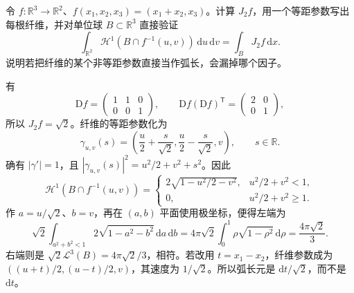 \begin{exercise}\label{g3:ex:coarea-oblique-projection}
	令 \(f:\mathbb R^3\to\mathbb R^2\)、\(f(x_1,x_2,x_3)=(x_1+x_2,x_3)\)。计算 \(J_2f\)，用一个等距参数写出每根纤维，并对单位球 \(B\subset\mathbb R^3\) 直接验证
	\[
		\int_{\mathbb R^2}\mathcal H^1(B\cap f^{-1}(u,v))\,\mathrm du\,\mathrm dv
		=\int_BJ_2f\,\mathrm dx.
	\]
	说明若把纤维的某个非等距参数直接当作弧长，会漏掉哪个因子。
\end{exercise}
\begin{solution}
	有
	\[
		\mathrm Df=\begin{pmatrix}1&1&0\\0&0&1\end{pmatrix},
		\qquad \mathrm Df(\mathrm Df)^{\mathsf T}=\begin{pmatrix}2&0\\0&1\end{pmatrix},
	\]
	所以 \(J_2f=\sqrt2\)。纤维的等距参数化为
	\[
		\gamma_{u,v}(s)=\left(\frac u2+\frac s{\sqrt2},
		\frac u2-\frac s{\sqrt2},v\right),\qquad s\in\mathbb R.
	\]
	确有 \(|\gamma'|=1\)，且 \(|\gamma_{u,v}(s)|^2=u^2/2+v^2+s^2\)。因此
	\[
		\mathcal H^1(B\cap f^{-1}(u,v))
		=\begin{cases}
		2\sqrt{1-u^2/2-v^2},&u^2/2+v^2<1,\\
		0,&u^2/2+v^2\ge1.
		\end{cases}
	\]
	作 \(a=u/\sqrt2\)、\(b=v\)，再在 \((a,b)\) 平面使用极坐标，便得左端为
	\[
		\sqrt2\int_{a^2+b^2<1}2\sqrt{1-a^2-b^2}\,\mathrm da\,\mathrm db
		=4\pi\sqrt2\int_0^1\rho\sqrt{1-\rho^2}\,\mathrm d\rho
		=\frac{4\pi\sqrt2}{3}.
	\]
	右端则是 \(\sqrt2\mathcal L^3(B)=4\pi\sqrt2/3\)，相符。若改用 \(t=x_1-x_2\)，纤维参数成为 \(((u+t)/2,(u-t)/2,v)\)，其速度为 \(1/\sqrt2\)。所以弧长元是 \(\mathrm dt/\sqrt2\)，而不是 \(\mathrm dt\)。
\end{solution}

